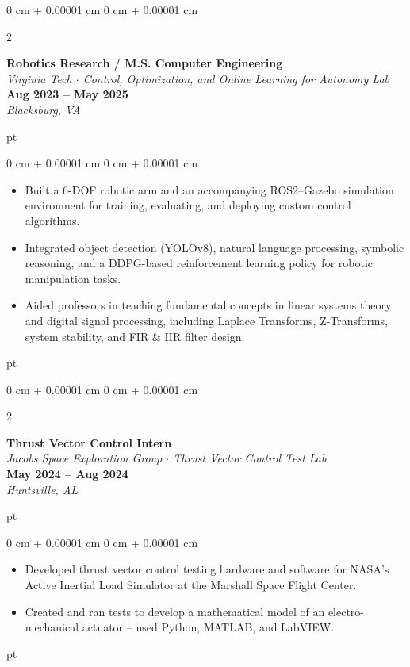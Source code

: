 \documentclass[10pt, letterpaper]{extarticle}
\newenvironment{highlights}{
    \begin{itemize}[
        topsep=0 pt,
        parsep=0 pt, 
        partopsep=0pt,
        itemsep=0pt,
        leftmargin=0.25 cm + 10pt
        ]
    }{
\end{itemize}
} %
\newenvironment{onecolentry}{
    \begin{adjustwidth}{
            0 cm + 0.00001 cm
        }{
            0 cm + 0.00001 cm
        }
    }{
    \end{adjustwidth}
} %
\newenvironment{twocolentry}[2][]{
    \onecolentry
    \def\secondColumn{#2}
    \setcolumnwidth{\fill, 4.5 cm}
    \begin{paracol}{2}
    }{
        \switchcolumn \raggedleft \secondColumn
    \end{paracol}
    \endonecolentry
} %
\begin{document}
\begin{twocolentry}{\textbf{Aug 2023 -- May 2025} \\\textit{Blacksburg, VA}}
    \textbf{Robotics Research / M.S. Computer Engineering}\\
    \textit{Virginia Tech $\cdot$ Control, Optimization, and Online Learning for Autonomy Lab}\\
\end{twocolentry}
 pt%
\begin{onecolentry}
    \begin{highlights}
    \item Built a 6-DOF robotic arm and an accompanying ROS2–Gazebo simulation environment for training, evaluating, and deploying custom control algorithms.
    \item Integrated object detection (YOLOv8), natural language processing, symbolic reasoning, and a DDPG-based reinforcement learning policy for robotic manipulation tasks.
    \item Aided professors in teaching fundamental concepts in linear systems theory and digital signal processing, including Laplace Transforms, Z-Transforms, system stability, and FIR \& IIR filter design.
    \end{highlights}
\end{onecolentry}
 pt%

\begin{twocolentry}{\textbf{May 2024 -- Aug 2024} \\\textit{Huntsville, AL}}
    \textbf{Thrust Vector Control Intern}\\
    \textit{Jacobs Space Exploration Group $\cdot$ Thrust Vector Control Test Lab}\\
\end{twocolentry}
 pt%
\begin{onecolentry}
    \begin{highlights}
    \item Developed thrust vector control testing hardware and software for NASA's Active Inertial Load Simulator at the Marshall Space Flight Center.
    \item Created and ran tests to develop a mathematical model of an electro-mechanical actuator -- used Python, MATLAB, and LabVIEW.
    \end{highlights}
\end{onecolentry}
 pt%
\end{document}
